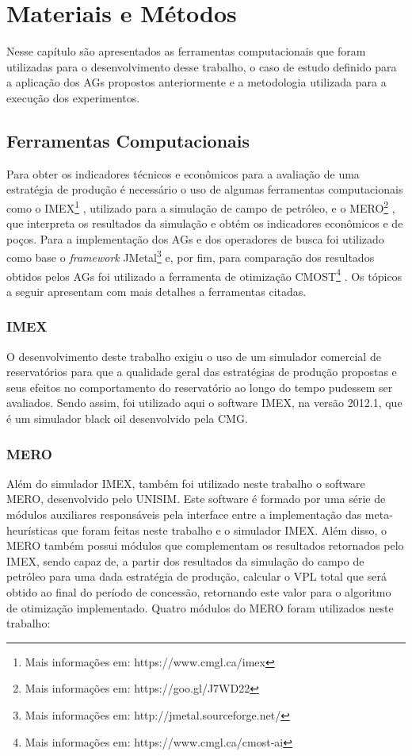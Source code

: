 \chapter{Materiais e Métodos}

Nesse capítulo são apresentados as ferramentas computacionais que foram utilizadas para o desenvolvimento desse trabalho, o caso de estudo definido para a aplicação dos AGs propostos anteriormente e a metodologia utilizada para a execução dos experimentos. 

\section{Ferramentas Computacionais}

Para obter os indicadores técnicos e econômicos para a avaliação de uma estratégia de produção é necessário o uso de algumas ferramentas computacionais como o IMEX\footnote{Mais informações em: https://www.cmgl.ca/imex} , utilizado para a simulação de campo de petróleo, e o MERO\footnote{Mais informações em: https://goo.gl/J7WD22} , que interpreta os resultados da simulação e obtém os indicadores econômicos e de poços. Para a implementação dos AGs e dos operadores de busca foi utilizado como base o \textit{framework} JMetal\footnote{Mais informações em: http://jmetal.sourceforge.net/}  e, por fim, para comparação dos resultados obtidos pelos AGs foi utilizado a ferramenta de otimização CMOST\footnote{Mais informações em: https://www.cmgl.ca/cmost-ai} . Os tópicos a seguir apresentam com mais detalhes a ferramentas citadas.

\subsection{IMEX}

O desenvolvimento deste trabalho exigiu o uso de um simulador comercial de reservatórios para que a qualidade geral das estratégias de produção propostas e seus efeitos no comportamento do reservatório ao longo do tempo pudessem ser avaliados. Sendo assim, foi utilizado aqui o software IMEX, na versão 2012.1, que é um simulador black oil desenvolvido pela CMG. 

\subsection{MERO}

Além do simulador IMEX, também foi utilizado neste trabalho o software MERO, desenvolvido pelo UNISIM. Este software é formado por uma série de módulos auxiliares responsáveis pela interface entre a implementação das meta-heurísticas que foram feitas neste trabalho e o simulador IMEX. Além disso, o MERO também possui módulos que complementam os resultados retornados pelo IMEX, sendo capaz de, a partir dos resultados da simulação do campo de petróleo para uma dada estratégia de produção, calcular o VPL total que será obtido ao final do período de concessão, retornando este valor para o algoritmo de otimização implementado. Quatro módulos do MERO foram utilizados neste trabalho:

